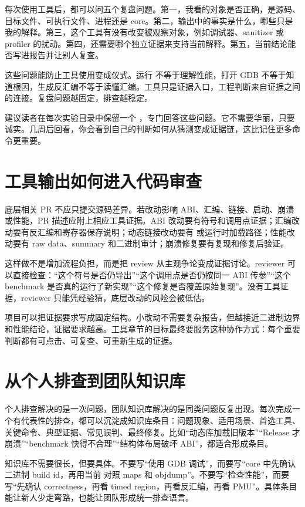 每次使用工具后，都可以问五个复盘问题。第一，我看的对象是否正确，是源码、目标文件、可执行文件、进程还是 core。第二，输出中的事实是什么，哪些只是我的解释。第三，这个工具有没有改变被观察对象，例如调试器、sanitizer 或 profiler 的扰动。第四，还需要哪个独立证据来支持当前解释。第五，当前结论能否写进报告并让别人复查。

这些问题能防止工具使用变成仪式。运行  不等于理解性能，打开 GDB 不等于知道根因，生成反汇编不等于读懂汇编。工具只是证据入口，工程判断来自证据之间的连接。复盘问题越固定，排查越稳定。

建议读者在每次实验目录中保留一个 ，专门回答这些问题。它不需要华丽，只要诚实。几周后回看，你会看到自己的判断如何从猜测变成证据链，这比记住更多命令更重要。

\section{工具输出如何进入代码审查}

底层相关 PR 不应只提交源码差异。若改动影响 ABI、汇编、链接、启动、崩溃或性能，PR 描述应附上相应工具证据。ABI 改动要有符号和调用点证据；汇编改动要有反汇编和寄存器保存说明；动态链接改动要有  或运行时加载路径；性能改动要有 raw data、summary 和二进制审计；崩溃修复要有复现和修复后验证。

这样做不是增加流程负担，而是把 review 从主观争论变成证据讨论。reviewer 可以直接检查：“这个符号是否仍导出”“这个调用点是否仍按同一 ABI 传参”“这个 benchmark 是否真的运行了新实现”“这个修复是否覆盖原始复现”。没有工具证据，reviewer 只能凭经验猜，底层改动的风险会被低估。

项目可以把证据要求写成固定结构。小改动不需要复杂报告，但越接近二进制边界和性能结论，证据要求越高。工具章节的目标最终要服务这种协作方式：每个重要判断都有可点击、可复查、可重新生成的证据。

\section{从个人排查到团队知识库}

个人排查解决的是一次问题，团队知识库解决的是同类问题反复出现。每次完成一个有代表性的排查，都可以沉淀成知识库条目：问题现象、适用场景、首选工具、关键命令、典型证据、常见误判、最终修复。比如“动态库加载旧版本”“Release 才崩溃”“benchmark 快得不合理”“结构体布局破坏 ABI”，都适合形成条目。

知识库不需要很长，但要具体。不要写“使用 GDB 调试”，而要写“core 中先确认二进制 build id，再用当前  对照 maps 和 objdump”。不要写“检查性能”，而要写“先确认 correctness，再看 timed region，再看反汇编，再看 PMU”。具体条目能让新人少走弯路，也能让团队形成统一排查语言。

